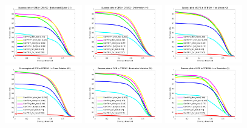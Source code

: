 \documentclass[journal]{IEEEtran}
\begin{document}
\begin{figure}[t!]
  \begin{center}
    \includegraphics[width=0.3\textwidth]{images/OTB2015/success_plot_OPE_OTB100_BC.png}
    \includegraphics[width=0.3\textwidth]{images/OTB2015/success_plot_OPE_OTB100_DEF.png}
    \includegraphics[width=0.3\textwidth]{images/OTB2015/success_plot_OPE_OTB100_FM.png}
    \includegraphics[width=0.3\textwidth]{images/OTB2015/success_plot_OPE_OTB100_IPR.png}
    \includegraphics[width=0.3\textwidth]{images/OTB2015/success_plot_OPE_OTB100_IV.png}
    \includegraphics[width=0.3\textwidth]{images/OTB2015/success_plot_OPE_OTB100_LR.png}

\end{center}
\end{figure}
\end{document}
